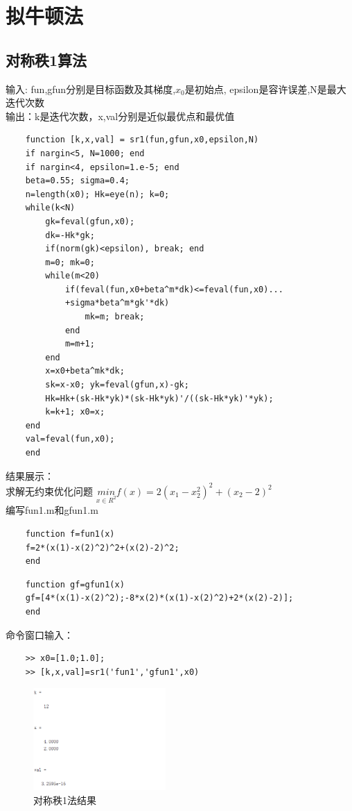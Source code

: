 \documentclass[12pt]{article} %
\begin{document}
	\section{拟牛顿法}
	\subsection{对称秩1算法}
	\indent 输入: fun,gfun分别是目标函数及其梯度,$x_0$是初始点,
epsilon是容许误差,N是最大迭代次数\\
	\indent 输出：k是迭代次数，x,val分别是近似最优点和最优值
	\begin{lstlisting}
	function [k,x,val] = sr1(fun,gfun,x0,epsilon,N)
	if nargin<5, N=1000; end
	if nargin<4, epsilon=1.e-5; end
	beta=0.55; sigma=0.4;
	n=length(x0); Hk=eye(n); k=0;
	while(k<N)
		gk=feval(gfun,x0);
		dk=-Hk*gk;
		if(norm(gk)<epsilon), break; end 
		m=0; mk=0;
		while(m<20)
			if(feval(fun,x0+beta^m*dk)<=feval(fun,x0)...
			+sigma*beta^m*gk'*dk)
				mk=m; break;
			end
			m=m+1;
		end
		x=x0+beta^mk*dk;
		sk=x-x0; yk=feval(gfun,x)-gk;
		Hk=Hk+(sk-Hk*yk)*(sk-Hk*yk)'/((sk-Hk*yk)'*yk);
		k=k+1; x0=x;
	end
	val=feval(fun,x0);
	end
	\end{lstlisting}
	结果展示：\\
	\indent 求解无约束优化问题 $\underset{x\in R^2}{min} f(x)=2(x_1-x_2^2)^2+(x_2-2)^2$\\
	\indent 编写fun1.m和gfun1.m
	\begin{lstlisting}
	function f=fun1(x)
	f=2*(x(1)-x(2)^2)^2+(x(2)-2)^2;
	end
	\end{lstlisting}
	\begin{lstlisting}
	function gf=gfun1(x)
	gf=[4*(x(1)-x(2)^2);-8*x(2)*(x(1)-x(2)^2)+2*(x(2)-2)];
	end
	\end{lstlisting}
	命令窗口输入：
	\begin{lstlisting}
	>> x0=[1.0;1.0];
	>> [k,x,val]=sr1('fun1','gfun1',x0)
	\end{lstlisting}
		\begin{figure}[ht]
		\centering
		\includegraphics[width=0.45\textwidth]{dc1.png}
		\caption{对称秩1法结果}
		\label{fig:fig1}
	\end{figure}
\end{document}
